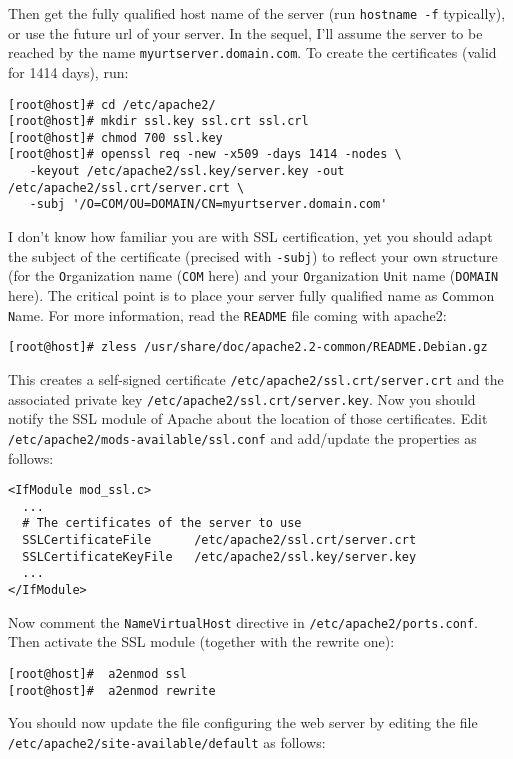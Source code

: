 Then get the fully qualified host name of the server (run \texttt{hostname -f}
typically), or use the future url of your server. 
In the sequel, I'll assume the server to be reached by the name
\texttt{myurtserver.domain.com}. 
To create the certificates (valid for 1414 days), run:  
  \begin{lstlisting}[style=command]
[root@host]# cd /etc/apache2/
[root@host]# mkdir ssl.key ssl.crt ssl.crl
[root@host]# chmod 700 ssl.key
[root@host]# openssl req -new -x509 -days 1414 -nodes \ 
   -keyout /etc/apache2/ssl.key/server.key -out /etc/apache2/ssl.crt/server.crt \ 
   -subj '/O=COM/OU=DOMAIN/CN=myurtserver.domain.com'
  \end{lstlisting}
I don't know how familiar you are with SSL certification, yet you should adapt
the subject of the certificate (precised with \texttt{-subj}) to reflect your
own structure (for the \texttt{O}rganization name (\texttt{COM} here) and your
\texttt{O}rganization \texttt{U}nit name (\texttt{DOMAIN} here). The critical
point is to place your server fully qualified name as \texttt{C}ommon
\texttt{N}ame.
For more information, read the \texttt{README} file coming with apache2: 
\begin{lstlisting}[style=command]
  [root@host]# zless /usr/share/doc/apache2.2-common/README.Debian.gz
\end{lstlisting}

This creates a self-signed certificate \texttt{/etc/apache2/ssl.crt/server.crt}
and the associated private key \texttt{/etc/apache2/ssl.crt/server.key}. 
Now you should notify the SSL module of Apache about the location of those
certificates. 
Edit \texttt{/etc/apache2/mods-available/ssl.conf} and add/update the
properties as follows: 
\begin{lstlisting}[style=apachecfg]
<IfModule mod_ssl.c>
  ...
  # The certificates of the server to use
  SSLCertificateFile      /etc/apache2/ssl.crt/server.crt
  SSLCertificateKeyFile   /etc/apache2/ssl.key/server.key
  ...
</IfModule>
\end{lstlisting}
Now comment the \texttt{NameVirtualHost} directive in \texttt{/etc/apache2/ports.conf}.
Then activate the SSL module (together with the rewrite one): 
\begin{lstlisting}[style=command]
[root@host]#  a2enmod ssl
[root@host]#  a2enmod rewrite
\end{lstlisting}

\noindent You should now update the file configuring the web server by editing
the file \texttt{/etc/apache2/site-available/default} as follows:  


